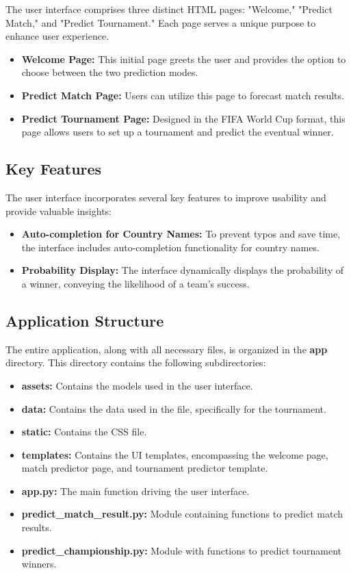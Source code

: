 \documentclass[a4paper,12pt]{article}
\begin{document}
The user interface comprises three distinct HTML pages: "Welcome," "Predict Match," and "Predict Tournament." Each page serves a unique purpose to enhance user experience.

\begin{itemize}
    \item \textbf{Welcome Page:} This initial page greets the user and provides the option to choose between the two prediction modes.
    \item \textbf{Predict Match Page:} Users can utilize this page to forecast match results.
    \item \textbf{Predict Tournament Page:} Designed in the FIFA World Cup format, this page allows users to set up a tournament and predict the eventual winner.
\end{itemize}

\subsection{Key Features}

The user interface incorporates several key features to improve usability and provide valuable insights:

\begin{itemize}
    \item \textbf{Auto-completion for Country Names:} To prevent typos and save time, the interface includes auto-completion functionality for country names.
    \item \textbf{Probability Display:} The interface dynamically displays the probability of a winner, conveying the likelihood of a team's success.
\end{itemize}

\subsection{Application Structure}

The entire application, along with all necessary files, is organized in the \textbf{app} directory. This directory contains the following subdirectories:

\begin{itemize}
    \item \textbf{assets:} Contains the models used in the user interface.
    \item \textbf{data:} Contains the data used in the file, specifically for the tournament.
    \item \textbf{static:} Contains the CSS file.
    \item \textbf{templates:} Contains the UI templates, encompassing the welcome page, match predictor page, and tournament predictor template.
    \item \textbf{app.py:} The main function driving the user interface.
    \item \textbf{predict\_match\_result.py:} Module containing functions to predict match results.
    \item \textbf{predict\_championship.py:} Module with functions to predict tournament winners.
\end{itemize}
\end{document}
